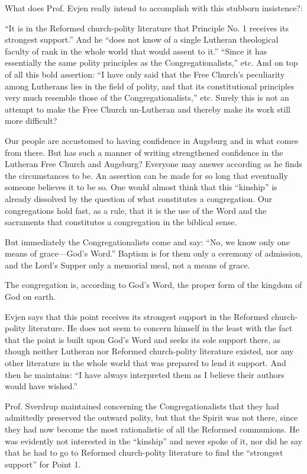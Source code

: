 What does Prof. Evjen really intend to accomplish with this stubborn insistence?:

“It is in the Reformed church-polity literature that Principle No. 1 receives its strongest support.” And he “does not know of a single Lutheran theological faculty of rank in the whole world that would assent to it.” “Since it has essentially the same polity principles as the Congregationalists,” etc. And on top of all this bold assertion: “I have only said that the Free Church’s peculiarity among Lutherans lies in the field of polity, and that its constitutional principles very much resemble those of the Congregationalists,” etc. Surely this is not an attempt to make the Free Church un-Lutheran and thereby make its work still more difficult?

Our people are accustomed to having confidence in Augsburg and in what comes from there. But has such a manner of writing strengthened confidence in the Lutheran Free Church and Augsburg? Everyone may answer according as he finds the circumstances to be. An assertion can be made for so long that eventually someone believes it to be so. One would almost think that this “kinship” is already dissolved by the question of what constitutes a congregation. Our congregations hold fast, as a rule, that it is the use of the Word and the sacraments that constitutes a congregation in the biblical sense.

But immediately the Congregationalists come and say: “No, we know only one means of grace—God’s Word.” Baptism is for them only a ceremony of admission, and the Lord’s Supper only a memorial meal, not a means of grace.

The congregation is, according to God’s Word, the proper form of the kingdom of God on earth.

Evjen says that this point receives its strongest support in the Reformed church-polity literature. He does not seem to concern himself in the least with the fact that the point is built upon God’s Word and seeks its sole support there, as though neither Lutheran nor Reformed church-polity literature existed, nor any other literature in the whole world that was prepared to lend it support. And then he maintains: “I have always interpreted them as I believe their authors would have wished.”

Prof. Sverdrup maintained concerning the Congregationalists that they had admittedly preserved the outward polity, but that the Spirit was not there, since they had now become the most rationalistic of all the Reformed communions. He was evidently not interested in the “kinship” and never spoke of it, nor did he say that he had to go to Reformed church-polity literature to find the “strongest support” for Point 1.

